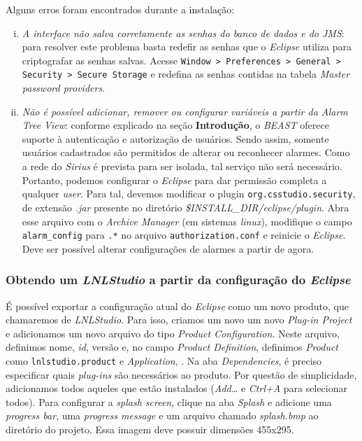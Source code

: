 Alguns erros foram encontrados durante a instalação:

\begin{enumerate}[i.]
  \item \textit{A interface não salva corretamente as senhas do banco de dados e
  do JMS}: para resolver este problema basta redefir as senhas que o
  \textit{Eclipse} utiliza para criptografar as senhas salvas. Acesse
  \texttt{Window > Preferences > General > Security > Secure Storage} e redefina
  as senhas contidas na tabela \textit{Master password providers}.

  \item \textit{Não é possível adicionar, remover ou configurar variáveis a
  partir da Alarm Tree View}: conforme explicado na seção \textbf{Introdução}, o
  \textit{BEAST} oferece suporte à autenticação e autorização de usuários. Sendo
  assim, somente usuários cadastrados são permitidos de alterar ou reconhecer
  alarmes. Como a rede do \textit{Sirius} é prevista para ser isolada, tal
  serviço não será necessário. Portanto, podemos configurar o \textit{Eclipse}
  para dar permissão completa a qualquer \textit{user}. Para tal, devemos
  modificar o plugin \texttt{org.csstudio.security}, de extensão \textit{.jar}
  presente no diretório \textit {\$INSTALL\_DIR/eclipse/plugin}. Abra esse
  arquivo com o \textit{Archive Manager} (em sistemas \textit{linux}),
  modifique o campo \texttt{alarm\_config} para \texttt{.*} no arquivo
  \texttt{authorization.conf} e reinicie o \textit{Eclipse}. Deve ser possível
  alterar configurações de alarmes a partir de agora.
\end{enumerate}

\subsubsection {Obtendo um \textit{LNLStudio} a partir da configuração do
\textit{Eclipse}}

É possível exportar a configuração atual do \textit{Eclipse} como um novo
produto, que chamaremos de \textit{LNLStudio}. Para isso, criamos um novo um
novo \textit{Plug-in Project} e adicionamos um novo arquivo do tipo
\textit{Product Configuration}. Neste arquivo, definimos nome, \textit{id},
versão e, no campo \textit{Product Definition}, definimos \textit{Product} como
\texttt{lnlstudio.product} e \textit{Application},
. Na aba \textit{Dependencies}, é preciso
especificar quais \textit{plug-ins} são necessários ao produto. Por questão de
simplicidade, adicionamos todos aqueles que estão instalados
(\textit{Add\ldots} e \textit{Ctrl+A} para selecionar todos). Para configurar a
\textit{splash screen}, clique na aba \textit{Splash} e adicione uma
\textit{progress bar}, uma \textit{progress message} e um arquivo chamado
\textit{splash.bmp} ao diretório do projeto. Essa imagem deve possuir dimensões
455x295. 

